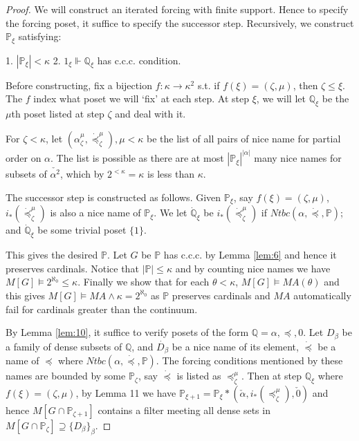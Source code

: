 \documentclass{article}
\newcommand{\bbP}{\mathbb{P}}
\newcommand{\bbQ}{\mathbb{Q}}
\begin{document}
\begin{proof}
    We will construct an iterated forcing with finite support. Hence to specify the forcing poset, it suffice to specify the successor step. Recursively, we construct $\mathbb{P}_\xi$ satisfying:

    1. $|\bbP_\xi|<\kappa$ 2. $1_\xi\Vdash \bbQ_\xi$ has c.c.c. condition.
        
    Before constructing, fix a bijection $f:\kappa\to \kappa^2$ s.t. if $f(\xi) = (\zeta,\mu)$, then $\zeta\leq \xi$. The $f$ index what poset we will `fix' at each step. At step $\xi$, we will let $\bbQ_\xi$ be the $\mu$th poset listed at step $\zeta$ and deal with it.

    For $\zeta<\kappa$, let $(\alpha^\mu_\zeta,\dot{\preceq}^\mu_\zeta),\mu<\kappa$ be the list of all pairs of nice name for partial order on $\alpha$. The list is possible as there are at most $|\bbP_\xi|^{|\alpha|}$ many nice names for subsets of $\check{\alpha^2}$, which by $2^{<\kappa} = \kappa$ is less than $\kappa$.

    The successor step is constructed as follows. Given $\bbP_\xi$, say $f(\xi) = (\zeta,\mu)$, $i_*(\dot{\preceq}^\mu_\zeta)$ is also a nice name of $\bbP_\xi$. We let $\dot{\bbQ}_\xi$ be $i_*(\dot{\preceq}^\mu_\zeta)$ if $Ntbc(\alpha,\dot{\preceq},\bbP)$; and $\dot{\bbQ}_\xi$ be some trivial poset $\{1\}$.

    This gives the desired $\bbP$. Let $G$ be  $\bbP$ has c.c.c. by Lemma \ref{lem:6} and hence it preserves cardinals. Notice that $|\bbP| \leq \kappa$ and by counting nice names we have $M[G]\models 2^{\aleph_0}\leq \kappa$. Finally we show that for each $\theta<\kappa$, $M[G]\models MA(\theta)$ and this gives $M[G]\models MA\land \kappa = 2^{\aleph_0}$ as $\bbP$ preserves cardinals and $MA$ automatically fail for cardinals greater than the continuum.

    By Lemma \ref{lem:10}, it suffice to verify posets of the form $\bbQ = \alpha,\preceq,0$. Let $D_\beta$ be a family of dense subsets of $\bbQ$, and $\dot{D_\beta}$ be a nice name of its element, $\dot{\preceq}$ be a name of $\preceq$ where $Ntbc(\alpha,\dot{\preceq},\bbP)$. The forcing conditions mentioned by these names are bounded by some $\bbP_\zeta$, say $\dot{\preceq}$ is listed as $\preceq^\mu_\zeta$. Then at step $\bbQ_\xi$ where $f(\xi) = (\zeta,\mu)$, by Lemma 11 we have $\bbP_{\xi+1} = \bbP_\xi * (\check{\alpha}, i_*(\preceq^\mu_\zeta), \check{0})$ and hence $M[G\cap \bbP_{\zeta+1}]$ contains a filter meeting all dense sets in $M[G\cap \bbP_{\zeta}]\supseteq \{D_\beta\}_\beta$.
\end{proof}
\end{document}

